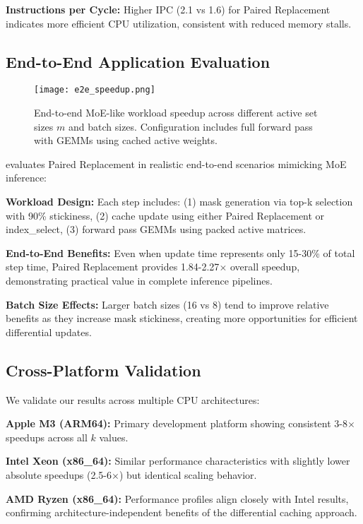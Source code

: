 \documentclass{article}
\numberwithin{equation}{section}
\theoremstyle{plain}
\theoremstyle{definition}
\theoremstyle{remark}
\begin{document}
\textbf{Instructions per Cycle:} Higher IPC (2.1 vs 1.6) for Paired Replacement indicates more efficient CPU utilization, consistent with reduced memory stalls.

\subsection{End-to-End Application Evaluation}

\begin{figure}[t]
\centering
\texttt{[image: e2e\_speedup.png]}
\caption{End-to-end MoE-like workload speedup across different active set sizes $m$ and batch sizes. Configuration includes full forward pass with GEMMs using cached active weights.}
\label{fig:e2e_results}
\end{figure}

 evaluates Paired Replacement in realistic end-to-end scenarios mimicking MoE inference:

\textbf{Workload Design:} Each step includes: (1) mask generation via top-k selection with 90\% stickiness, (2) cache update using either Paired Replacement or index\_select, (3) forward pass GEMMs using packed active matrices.

\textbf{End-to-End Benefits:} Even when update time represents only 15-30\% of total step time, Paired Replacement provides 1.84-2.27$\times$ overall speedup, demonstrating practical value in complete inference pipelines.

\textbf{Batch Size Effects:} Larger batch sizes (16 vs 8) tend to improve relative benefits as they increase mask stickiness, creating more opportunities for efficient differential updates.

\subsection{Cross-Platform Validation}

We validate our results across multiple CPU architectures:

\textbf{Apple M3 (ARM64):} Primary development platform showing consistent 3-8$\times$ speedups across all $k$ values.

\textbf{Intel Xeon (x86\_64):} Similar performance characteristics with slightly lower absolute speedups (2.5-6$\times$) but identical scaling behavior.

\textbf{AMD Ryzen (x86\_64):} Performance profiles align closely with Intel results, confirming architecture-independent benefits of the differential caching approach.
\end{document}
